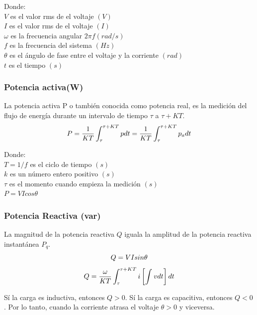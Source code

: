 Donde:\\
$V$ es el valor rms de el voltaje $(V)$\\
$I$ es el valor rms de el voltaje $(I)$\\
$\omega$ es la frecuencia angular  $2\pi f(rad/s)$\\
$f$ es la frecuencia del sistema $(Hz)$\\
$\theta$ es el ángulo de fase entre el voltaje y la corriente  $(rad)$\\
$t$ es el tiempo $(s)$\\
\subsubsection{Potencia activa(W)}

La potencia activa P o también conocida como potencia real, es la medición del flujo de energía durante un intervalo de tiempo $\tau$ a $\tau + KT$. \cite{A30}\\

\begin{equation}\label{EQ16}
P=\frac{1}{KT}\int_{\tau}^{\tau + KT}pdt = \frac{1}{KT}\int_{\tau}^{\tau + KT}p_{a}dt\\
\end{equation}

Donde:\\
$T=1/f$ es el ciclo de tiempo $(s)$\\
$k$     es un número entero positivo $(s)$\\
$\tau$  es el momento cuando empieza la medición $(s)$\\
$P=VIcos \theta$\\
\subsubsection{Potencia Reactiva (var)}

La magnitud de la potencia reactiva $Q$ iguala la amplitud de la potencia reactiva instantánea $P_{q}$.\cite{A30}\\
\begin{equation}\label{EQ17}
Q=VIsin \theta\\
\end{equation}
\begin{equation}\label{EQ18}
Q=\frac{\omega}{KT}\int_{\tau}^{\tau + KT}i\left[\int_{}^{}vdt\right] dt\\
\end{equation}

Sí la carga es inductiva, entonces $Q>0$. Sí la carga es capacitiva, entonces $Q<0$. Por lo tanto, cuando la corriente atrasa el voltaje $\theta>0$ y viceversa.\\
